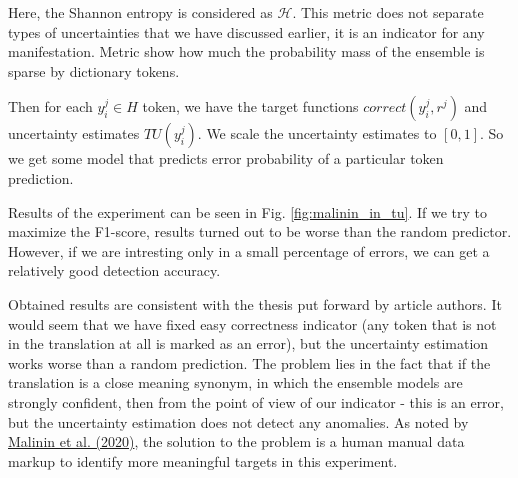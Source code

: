 \documentclass[a4paper,14pt]{extarticle}
\newcommand{\bibref}[3]{\hyperlink{#1}{#2 (#3)}}
\begin{document}
	Here, the Shannon entropy is considered as $\mathcal{H}$. This metric does not separate types of uncertainties that we have discussed earlier, it is an indicator for any manifestation. Metric show how much the probability mass of the ensemble is sparse by dictionary tokens.

	Then for each $y_i^j \in H$ token, we have the target functions $correct(y_i^j, r^j)$ and uncertainty estimates $TU (y_i^j)$. We scale the uncertainty estimates to $[0, 1]$. So we get some model that predicts error probability of a particular token prediction.
	
	\begin{figure}[t]
	\end{figure}
	Results of the experiment can be seen in Fig. \ref{fig:malinin_in_tu}. If we try to maximize the F1-score, results turned out to be worse than the random predictor. However, if we are intresting only in a small percentage of errors, we can get a relatively good detection accuracy.

	Obtained results are consistent with the thesis put forward by article authors. It would seem that we have fixed easy correctness indicator (any token that is not in the translation at all is marked as an error), but the uncertainty estimation works worse than a random prediction. The problem lies in the fact that if the translation is a close meaning synonym, in which the ensemble models are strongly confident, then from the point of view of our indicator - this is an error, but the uncertainty estimation does not detect any anomalies. As noted by \bibref{uncertainty}{Malinin et al.} {2020}, the solution to the problem is a human manual data markup to identify more meaningful targets in this experiment.
\end{document}
